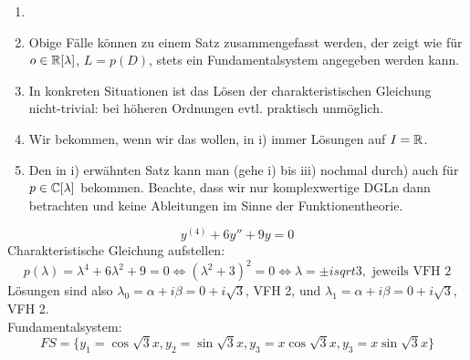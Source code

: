  \begin{bemerkung}
 	\begin{enumerate}
 		\item[]
 		\item Obige F\"alle k\"onnen zu einem Satz zusammengefasst werden, der zeigt wie f\"ur $ o\in\mathbb{R}[\lambda] $, $ L=p(D) $, stets ein Fundamentalsystem angegeben werden kann.
 		\item In konkreten Situationen ist das L\"osen der charakteristischen Gleichung nicht-trivial: bei h\"oheren Ordnungen evtl. praktisch unm\"oglich.
 		\item Wir bekommen, wenn wir das wollen, in i) immer L\"osungen auf $ I=\mathbb{R} $.
 		\item Den in i) erw\"ahnten Satz kann man (gehe i) bis iii) nochmal durch) auch f\"ur $ p\in\mathbb{C}[\lambda] $ bekommen. Beachte, dass wir nur komplexwertige DGLn dann betrachten und keine Ableitungen im Sinne der Funktionentheorie.
 	\end{enumerate}
 \end{bemerkung}
 \begin{beispiel}
 	\[ y^{(4)}+6y''+9y=0 \]
 	Charakteristische Gleichung aufstellen:
 	\[ p(\lambda)=\lambda^4+6\lambda^2+9=0\Leftrightarrow(\lambda^2+3)^2=0\Leftrightarrow\lambda=\pm isqrt{3},\text{ jeweils VFH }2 \]
 	L\"osungen sind also $ \lambda_0=\alpha+i\beta=0+i\sqrt{3} $, VFH 2, und $ \lambda_1=\alpha+i\beta=0+i\sqrt{3} $, VFH 2.\\
 	Fundamentalsystem:
 	\[ FS=\lbrace y_1=\cos\sqrt{3}x,y_2=\sin\sqrt{3}x,y_3=x\cos\sqrt{3}x,y_3=x\sin\sqrt{3}x\rbrace \]
 \end{beispiel}
